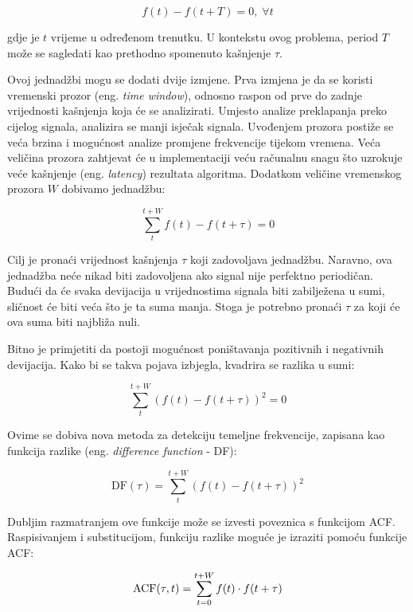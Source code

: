 \documentclass[times, utf8, diplomski, numeric]{fer}
\begin{document}
\begin{equation}
	f(t) - f(t + T) = 0, \; \forall t
\end{equation}

gdje je $t$ vrijeme u određenom trenutku. U kontekstu ovog problema, period $T$ može se sagledati kao prethodno spomenuto kašnjenje $\tau$.

Ovoj jednadžbi mogu se dodati dvije izmjene. Prva izmjena je da se koristi vremenski prozor (eng. \textit{time window}), odnosno raspon od prve do zadnje vrijednosti kašnjenja koja će se analizirati. Umjesto analize preklapanja preko cijelog signala, analizira se manji isječak signala. Uvođenjem prozora postiže se veća brzina i mogućnost analize promjene frekvencije tijekom vremena. Veća veličina prozora zahtjevat će u implementaciji veću računalnu snagu što uzrokuje veće kašnjenje (eng. \textit{latency}) rezultata algoritma. Dodatkom veličine vremenskog prozora $W$ dobivamo jednadžbu:

\begin{equation}
	\sum_{t}^{t + W} {f(t) - f(t + \tau)} = 0
\end{equation}

Cilj je pronaći vrijednost kašnjenja $\tau$ koji zadovoljava jednadžbu. Naravno, ova jednadžba neće nikad biti zadovoljena ako signal nije perfektno periodičan. Budući da će svaka devijacija u vrijednostima signala biti zabilježena u sumi, sličnost će biti veća što je ta suma manja. Stoga je potrebno pronaći $\tau$ za koji će ova suma biti najbliža nuli.

Bitno je primjetiti da postoji mogućnost poništavanja pozitivnih i negativnih devijacija. Kako bi se takva pojava izbjegla, kvadrira se razlika u sumi:

\begin{equation}
	\sum_{t}^{t + W} {(f(t) - f(t + \tau))^2} = 0
\end{equation}

Ovime se dobiva nova metoda za detekciju temeljne frekvencije, zapisana kao funkcija razlike (eng. \textit{difference function} - DF):

\begin{equation}
	\mathrm{DF}(\tau) = \sum_{t}^{t + W} {(f(t) - f(t + \tau))^2}
\end{equation}

Dubljim razmatranjem ove funkcije može se izvesti poveznica s funkcijom ACF. Raspisivanjem i substitucijom, funkciju razlike moguće je izraziti pomoću funkcije ACF:

\begin{equation}
	\mathrm{ACF}(\tau, t) = \sum_{t = 0}^{t + W} {f(t) \cdot f(t + \tau)} \\
\end{equation}
\end{document}
